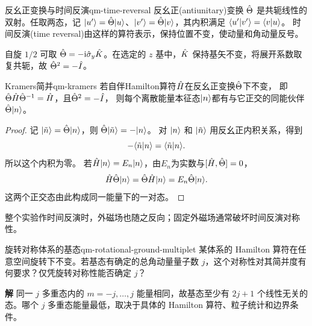 \begin{definition}{反幺正变换与时间反演}{qm-time-reversal}
    反幺正(antiunitary)变换 $\hat{\Theta}$ 是共轭线性的双射。任取两态，记 $\lvert u'\rangle = \hat{\Theta}\lvert u\rangle$、$\lvert v'\rangle = \hat{\Theta}\lvert v\rangle$，其内积满足 $\langle u'\vert v'\rangle = \langle v\vert u\rangle$。
    时间反演(time reversal)由这样的算符表示，保持位置不变，使动量和角动量反号。
\end{definition}
自旋 $1/2$ 可取 $\hat{\Theta} = -\mathrm{i}\hat{\sigma}_y \hat{K}$。在选定的 $z$ 基中，$\hat{K}$ 保持基矢不变，将展开系数取复共轭，故 $\hat{\Theta}^2 = -\hat{I}$。
\begin{theorem}{Kramers简并}{qm-kramers}
    若自伴Hamilton算符$\hat{H}$在反幺正变换$\hat{\Theta}$下不变，
    即$\hat{\Theta} \hat{H}\hat{\Theta}^{-1} = \hat{H}$，且$\hat{\Theta}^2 = -\hat{I}$，
    则每个离散能量本征态$\lvert n\rangle$都有与它正交的同能伙伴$\hat{\Theta}\lvert n\rangle$。
\end{theorem}
\begin{proof}
    记 $\lvert\tilde n\rangle = \hat{\Theta}\lvert n\rangle$，则 $\hat{\Theta}\lvert\tilde n\rangle = -\lvert n\rangle$。
    对 $\lvert n\rangle$ 和 $\lvert\tilde n\rangle$ 用反幺正内积关系，得到
    \[
        -\langle\tilde n\vert n\rangle = \langle\tilde n\vert n\rangle.
    \]
    所以这个内积为零。
    若$\hat{H}\lvert n\rangle = E_n\lvert n\rangle$，由$E_n$为实数与$[\hat{H},\hat{\Theta}] = 0$，
    \begin{equation}
        \hat{H}\hat{\Theta}\lvert n\rangle = \hat{\Theta} \hat{H}\lvert n\rangle = E_n\hat{\Theta}\lvert n\rangle.
    \end{equation}
    这两个正交态由此构成同一能量下的一对态。
\end{proof}

整个实验作时间反演时，外磁场也随之反向；固定外磁场通常破坏时间反演对称性。

\begin{example}{旋转对称体系的基态}{qm-rotational-ground-multiplet}
    某体系的 Hamilton 算符在任意空间旋转下不变。若基态有确定的总角动量量子数 $j$，这个对称性对其简并度有何要求？仅凭旋转对称性能否确定 $j$？
    \par\smallskip\textbf{解}\quad
    同一 $j$ 多重态内的 $m = -j,\ldots,j$ 能量相同，故基态至少有 $2j + 1$ 个线性无关的态。哪个 $j$ 多重态能量最低，取决于具体的 Hamilton 算符、粒子统计和边界条件。
\end{example}
